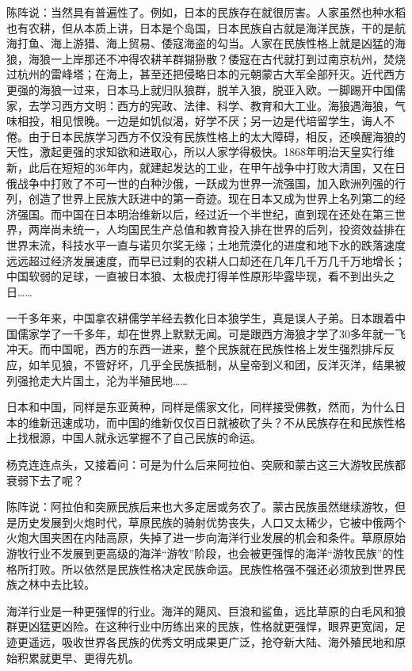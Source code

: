 \par 陈阵说：当然具有普遍性了。例如，日本的民族存在就很厉害。人家虽然也种水稻也有农耕，但从本质上讲，日本是个岛国，日本民族自古就是海洋民族，干的是航海打鱼、海上游猎、海上贸易、倭寇海盗的勾当。人家在民族性格上就是凶猛的海狼，海狼一上岸那还不冲得农耕羊群猢狲散？倭寇在古代就打到过南京杭州，焚烧过杭州的雷峰塔；在海上，甚至还把侵略日本的元朝蒙古大军全部歼灭。近代西方更强的海狼一过来，日本马上就归队狼群，脱羊入狼，脱亚入欧。一脚踢开中国儒家，去学习西方文明：西方的宪政、法律、科学、教育和大工业。海狼遇海狼，气味相投，相见恨晚。一边是如饥似渴，好学不厌；另一边是代培留学生，诲人不倦。由于日本民族学习西方不仅没有民族性格上的太大障碍，相反，还唤醒海狼的天性，激起更强的求知欲和进取心，所以人家学得极快。1868年明治天皇实行维新，此后在短短的36年内，就建起发达的工业，在甲午战争中打败大清国，又在日俄战争中打败了不可一世的白种沙俄，一跃成为世界一流强国，加入欧洲列强的行列，创造了世界上民族大跃进中的第一奇迹。现在日本又成为世界上名列第二的经济强国。而中国在日本明治维新以后，经过近一个半世纪，直到现在还处在第三世界，两岸尚未统一，人均国民生产总值和教育投入排在世界的后列，投资效益排在世界末流，科技水平一直与诺贝尔奖无缘；土地荒漠化的进度和地下水的跌落速度远远超过经济发展速度，而早已过剩的农耕人口却还在几年几千万几千万地增长；中国软弱的足球，一直被日本狼、太极虎打得羊性原形毕露毕现，看不到出头之日……
\par 一千多年来，中国拿农耕儒学羊经去教化日本狼学生，真是误人子弟。日本跟着中国儒家学了一千多年，却在世界上默默无闻。可是跟西方海狼才学了30多年就一飞冲天。而中国呢，西方的东西一进来，整个民族就在民族性格上发生强烈排斥反应，如羊见狼，不管好坏，几乎全民族抵制，从皇帝到义和团，反洋灭洋，结果被列强抢走大片国土，沦为半殖民地……
\par 日本和中国，同样是东亚黄种，同样是儒家文化，同样接受佛教，然而，为什么日本的维新迅速成功，而中国的维新仅仅百日就被砍了头？不从民族存在和民族性格上找根源，中国人就永远掌握不了自己民族的命运。
\par 杨克连连点头，又接着问：可是为什么后来阿拉伯、突厥和蒙古这三大游牧民族都衰弱下去了呢？
\par 陈阵说：阿拉伯和突厥民族后来也大多定居或务农了。蒙古民族虽然继续游牧，但是历史发展到火炮时代，草原民族的骑射优势丧失，人口又太稀少，它被中俄两个火炮大国夹困在内陆高原，失掉了进一步向海洋行业发展的机会和条件。草原原始游牧行业不发展到更高级的海洋“游牧”阶段，也会被更强悍的海洋“游牧民族”的性格所打败。所以依然是民族性格决定民族命运。民族性格强不强还必须放到世界民族之林中去比较。
\par 海洋行业是一种更强悍的行业。海洋的飓风、巨浪和鲨鱼，远比草原的白毛风和狼群更凶猛更凶险。在这种行业中历练出来的民族，性格就更强悍，眼界更宽阔，足迹更遥远，吸收世界各民族的优秀文明成果更广泛，抢夺新大陆、海外殖民地和原始积累就更早、更得先机。

